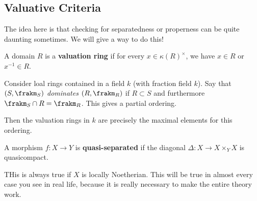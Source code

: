 \documentclass[12pt]{article}
\begin{document}
\subsection{Valuative Criteria}
The idea here is that checking for separatedness or properness can be quite daunting sometimes. We will give a way to do this!
\begin{defn}
	A domain $R$ is a \textbf{valuation ring} if for every $x\in \kappa(R)^\times$, we have $x\in R$ or $x^{-1}\in R$.
\end{defn}
\begin{lem}
	Consider loal rings contained in a field $k$ (with fraction field $k$). Say that $(S,\frakm_S)$ \textit{dominates} $(R,\frakm_R)$ if $R\subset S$ 
	and furthermore $\frakm_S\cap R=\frakm_R$. This gives a partial ordering. 

	Then the valuation rings in $k$ are precisely the maximal elements for this ordering.
\end{lem}
\begin{defn}
	A morphism $f:X\to Y$ is \textbf{quasi-separated} if the diagonal $\Delta:X\to X\times_Y X$ is quasicompact.
\end{defn}
THis is always true if $X$ is locally Noetherian. This will be true in almost every case you see in real life, because it 
is really necessary to make the entire theory work.
\end{document}
